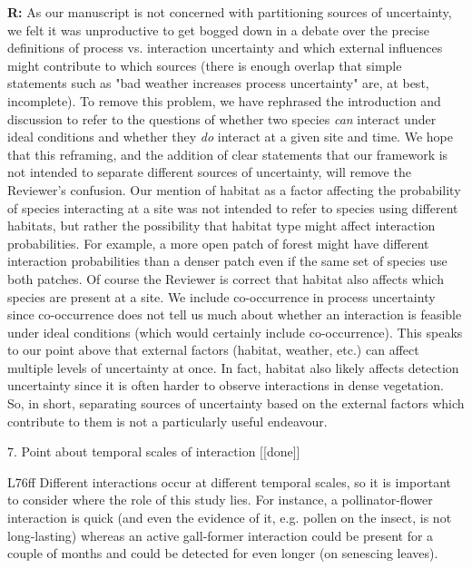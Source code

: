 \documentclass[12pt]{letter}
\newenvironment{refquote}{\bigskip \begin{it}}{\end{it}\smallskip}
\begin{document}
\begin{itemize}
		\textbf{R:} As our manuscript is not concerned with partitioning sources of uncertainty, we felt it was unproductive to get bogged down in a debate over the precise definitions of process vs. interaction uncertainty and which external influences might contribute to which sources (there is enough overlap that simple statements such as "bad weather increases process uncertainty" are, at best, incomplete). To remove this problem, we have rephrased the introduction and discussion to refer to the questions of whether two species \emph{can} interact under ideal conditions and whether they \emph{do} interact at a given site and time. We hope that this reframing, and the addition of clear statements that our framework is not intended to separate different sources of uncertainty, will remove the Reviewer's confusion.
		\smallskip
		Our mention of habitat as a factor affecting the probability of species interacting at a site was not intended to refer to species using different habitats, but rather the possibility that habitat type might affect interaction probabilities. For example, a more open patch of forest might have different interaction probabilities than a denser patch even if the same set of species use both patches. Of course the Reviewer is correct that habitat also affects which species are present at a site. We include co-occurrence in process uncertainty since co-occurrence does not tell us much about whether an interaction is feasible under ideal conditions (which would certainly include co-occurrence). This speaks to our point above that external factors (habitat, weather, etc.) can affect multiple levels of uncertainty at once. In fact, habitat also likely affects detection uncertainty since it is often harder to observe interactions in dense vegetation. So, in short, separating sources of uncertainty based on the external factors which contribute to them is not a particularly useful endeavour.


	7. Point about temporal scales of interaction [[done]]

		\begin{refquote}
		L76ff Different interactions occur at different temporal scales, so it is important to consider where the role of this study lies. For instance, a pollinator-flower interaction is quick (and even the evidence of it, e.g. pollen on the insect, is not long-lasting) whereas an active gall-former interaction could be present for a couple of months and could be detected for even longer (on senescing leaves).
		\end{refquote}



\end{itemize}
\end{document}
